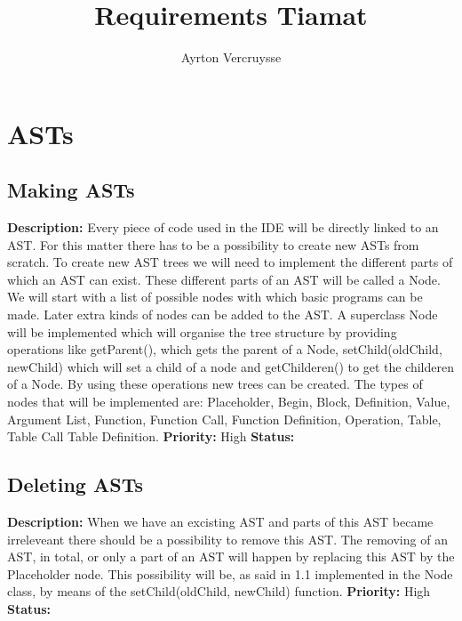 \documentclass{article}
\title{Requirements Tiamat}
\author{Ayrton Vercruysse}
\begin{document}
\maketitle
\tableofcontents
\section{ASTs}
\subsection{Making ASTs}
\textbf{Description: } Every piece of code used in the IDE will be directly linked to an AST. For this matter there has to be a possibility to create new ASTs from scratch.
To create new AST trees we will need to implement the different parts of which an AST can exist. These different parts of an AST will be called a Node. We will start with
a list of possible nodes with which basic programs can be made. Later extra kinds of nodes can be added to the AST.
A superclass Node will be implemented which will organise the tree structure by providing operations like getParent(), which gets the parent of a Node, setChild(oldChild, newChild)
which will set a child of a node and getChilderen() to get the childeren of a Node. By using these operations new trees can be created. 
The types of nodes that will be implemented are: Placeholder, Begin, Block, Definition, Value, Argument List, Function, Function Call, Function Definition, Operation, Table, Table Call
Table Definition.
 \newline
\textbf{Priority:} High \newline
\textbf{Status: } \newline
\subsection{Deleting ASTs}
\textbf{Description: }When we have an excisting AST and parts of this AST became irreleveant there should be a possibility to remove this AST. The removing of an AST, in total,
or only a part of an AST will happen by replacing this AST by the Placeholder node. This possibility will be, as said in 1.1 implemented in the Node class, by means of the 
setChild(oldChild, newChild) function. \newline
\textbf{Priority:} High \newline
\textbf{Status: } \newline
\end{document}
